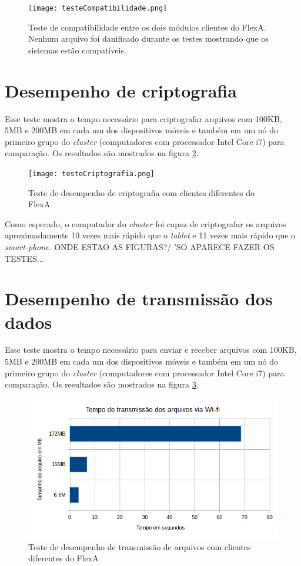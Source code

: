     \begin{figure}[!ht]
    \centering
    \texttt{[image: testeCompatibilidade.png]}
    \caption{Teste de compatibilidade entre os dois módulos clientes do FlexA. Nenhum arquivo foi danificado durante os testes mostrando que os sistemas estão compatíveis.}
    \label{fig:testeCompatibilidade}
    \end{figure}
    
\section{Desempenho de criptografia}

    Esse teste mostra o tempo necessário para criptografar arquivos com 100KB, 5MB e 200MB em cada um dos dispositivos móveis e também em um nó do primeiro grupo do \textit{cluster} (computadores com processador Intel Core i7) para comparação. Os resultados são mostrados na figura \ref{fig:testesCriptografia}.
    
    \begin{figure}[!ht]
    \centering
    \texttt{[image: testeCriptografia.png]}
    \caption{Teste de desempenho de criptografia com clientes diferentes do FlexA}
    \label{fig:testesCriptografia}
    \end{figure}
    
    Como esperado, o computador do \textit{cluster} foi capaz de criptografar os arquivos aproximadamente 10 vezes mais rápido que o \textit{tablet} e 11 vezes mais rápido que o \textit{smart-phone}.   ONDE ESTAO AS FIGURAS?/  'SO APARECE FAZER OS TESTES...
    
\section{Desempenho de transmissão dos dados}

    Esse teste mostra o tempo necessário para enviar e receber arquivos com 100KB, 5MB e 200MB em cada um dos dispositivos móveis e também em um nó do primeiro grupo do \textit{cluster} (computadores com processador Intel Core i7) para comparação. Os resultados são mostrados na figura \ref{fig:testeTransmissao}.
    
    \begin{figure}[!ht]
    \centering
    \includegraphics[width=14cm]{testeTransmissao.png}
    \caption{Teste de desempenho de transmissão de arquivos com clientes diferentes do FlexA}
    \label{fig:testeTransmissao}
    \end{figure}
    

